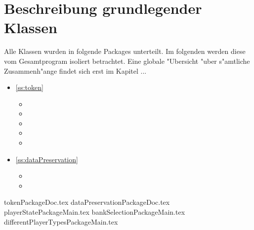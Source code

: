 \section{Beschreibung grundlegender Klassen}
Alle Klassen wurden in folgende Packages unterteilt. Im folgenden werden diese vom Gesamtprogram isoliert betrachtet. Eine globale "Ubersicht "uber s"amtliche Zusammenh"ange findet sich erst im Kapitel ...
\begin{itemize}
	\item \ref{ss:token} 
	\begin{itemize}
		\item {}
		\item {}
		\item {}
		\item {}
		\item {}
	\end{itemize}
	\item \ref{ss:dataPreservation} 
	\begin{itemize}
		\item {}
		\item {}
	\end{itemize}
\end{itemize}
{tokenPackageDoc.tex}
\newpage
{dataPreservationPackageDoc.tex}
\newpage
{playerStatePackageMain.tex}
\newpage
{bankSelectionPackageMain.tex}
\newpage
{differentPlayerTypesPackageMain.tex}
